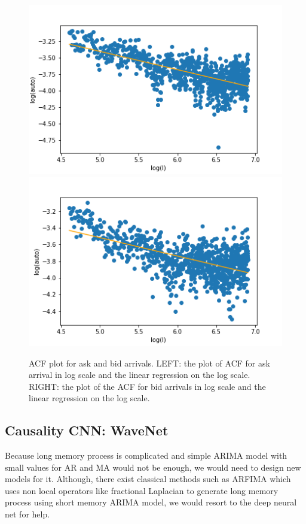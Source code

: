 \documentclass[letterpaper,12pt]{article}
\numberwithin{equation}{section}
\begin{document}
\begin{figure}
    \centering
    \includegraphics[scale = 0.5]{figs/ACF_ask.png}
    \includegraphics[scale = 0.5]{figs/ACF_bid.png}
    \caption{\small ACF plot for ask and bid arrivals. LEFT: the plot of ACF for ask arrival in log scale and the linear regression on the log scale. RIGHT: the plot of the ACF for bid arrivals in log scale and the linear regression on the log scale. }
    \label{sec2:fig:acf_plot}
\end{figure}

\subsection{Causality CNN: WaveNet}
Because long memory process is complicated and simple ARIMA model with small values for AR and MA would not be enough, we would need to design new models for it.  Although, there exist classical methods such as ARFIMA which uses non local operators like fractional Laplacian to generate long memory process using short memory ARIMA model, we would resort to the deep neural net for help. 
\end{document}
